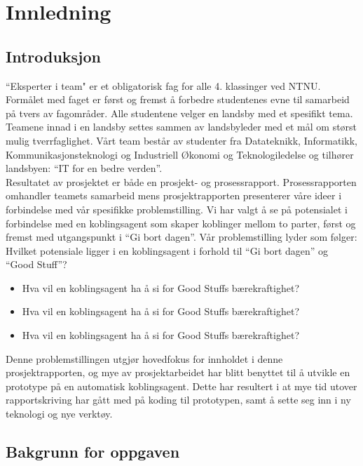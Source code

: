 \section{Innledning}
\subsection{Introduksjon}

``Eksperter i team" er et obligatorisk fag for alle 4. klassinger ved NTNU. Formålet med faget er først og fremst å forbedre studentenes evne til samarbeid på tvers av fagområder. Alle studentene velger en landsby med et spesifikt tema. Teamene innad i en landsby settes sammen av landsbyleder med et mål om størst mulig tverrfaglighet. Vårt team består av studenter fra Datateknikk, Informatikk, Kommunikasjonsteknologi og Industriell Økonomi og Teknologiledelse og tilhører landsbyen: ``IT for en bedre verden”.\\

Resultatet av prosjektet er både en prosjekt- og prosessrapport. Prosessrapporten omhandler teamets samarbeid mens prosjektrapporten presenterer våre ideer i forbindelse med vår spesifikke problemstilling. Vi har valgt å se på potensialet i forbindelse med en koblingsagent som skaper koblinger mellom to parter, først og fremst med utgangspunkt i ``Gi bort dagen”. Vår problemstilling lyder som følger:
Hvilket potensiale ligger i en koblingsagent i forhold til ``Gi bort dagen” og ``Good Stuff”?

\begin{itemize}
  \item Hva vil en koblingsagent ha å si for Good Stuffs bærekraftighet?
  \item Hva vil en koblingsagent ha å si for Good Stuffs bærekraftighet?
  \item Hva vil en koblingsagent ha å si for Good Stuffs bærekraftighet?
\end{itemize}

Denne problemstillingen utgjør hovedfokus for innholdet i denne prosjektrapporten, og mye av prosjektarbeidet har blitt benyttet til å utvikle en prototype på en automatisk koblingsagent. Dette har resultert i at mye tid utover rapportskriving har gått med på koding til prototypen, samt å sette seg inn i ny teknologi og nye verktøy.

\subsection{Bakgrunn for oppgaven}

